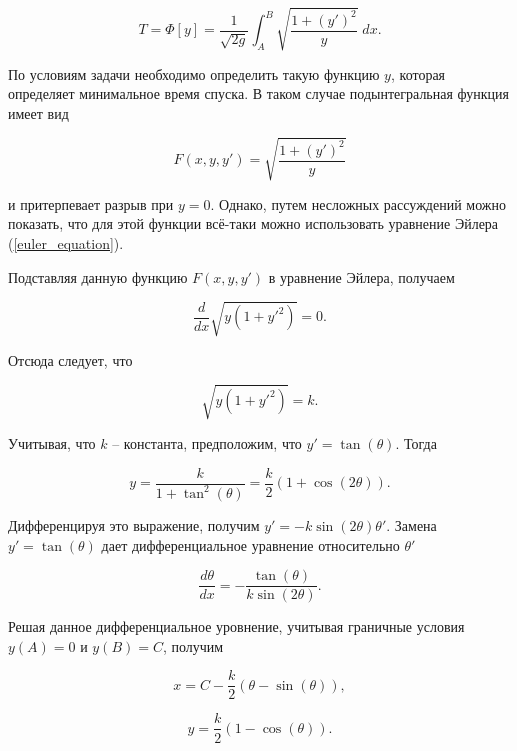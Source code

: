 \begin{displaymath}
	T = \Phi[y] = \frac{1}{\sqrt{2g}} \int_{A}^{B} \sqrt{\frac{1 + (y')^2}{y}} \; dx.
\end{displaymath}

\noindent По условиям задачи необходимо определить такую функцию $y$, которая определяет минимальное время спуска. В таком случае подынтегральная функция имеет вид

\begin{displaymath}
	F(x, y, y') = \sqrt{\frac{1 + (y')^2}{y}}
\end{displaymath}

\noindent и притерпевает разрыв при $y = 0$. Однако, путем несложных рассуждений можно показать, что для этой функции всё-таки можно использовать уравнение Эйлера (\ref{euler_equation}).

Подставляя данную функцию $F(x, y, y')$ в уравнение Эйлера, получаем

\begin{displaymath}
	\frac{d}{dx} \sqrt{y (1+y'^2)} = 0.
\end{displaymath}

\noindent Отсюда следует, что

\begin{displaymath}
	\sqrt{y (1+y'^2)} = k.
\end{displaymath}

\noindent Учитывая, что $k$ -- константа, предположим, что $y' = \tan(\theta)$. Тогда

\begin{displaymath}
	y = \frac{k}{1 + \tan^2(\theta)} = \frac{k}{2}(1 + \cos(2\theta)).
\end{displaymath}

\noindent Дифференцируя это выражение, получим $y' = -k \sin(2\theta) \theta'$. Замена $y' = \tan(\theta)$ дает дифференциальное уравнение относительно $\theta'$

\begin{displaymath}
	\frac{d \theta}{dx} = - \frac{\tan(\theta)}{k \sin(2\theta)}.
\end{displaymath}

\noindent Решая данное дифференциальное уровнение, учитывая граничные условия $y(A) = 0$ и $y(B) = C$, получим

\begin{displaymath}
	x = C - \frac{k}{2}(\theta - \sin(\theta)),
\end{displaymath}

\begin{displaymath}
	y = \frac{k}{2}(1 - \cos(\theta)).
\end{displaymath}

